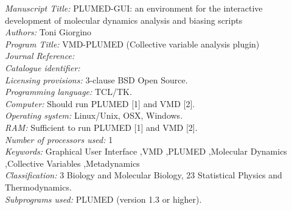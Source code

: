 \documentclass[preprint,12pt]{elsarticle}
\newcounter{bla}
\newcommand{\mytitle}{PLUMED-GUI: an environment for the interactive development 
  of molecular dynamics analysis and biasing scripts}
\newcommand{\mykeywords}{Graphical User Interface \sep VMD \sep PLUMED \sep Molecular Dynamics \sep Collective Variables \sep Metadynamics}
\begin{document}
\begin{small}
\noindent
{\em Manuscript Title:}                                       
 \mytitle \\
{\em Authors:}                                                
 Toni Giorgino \\
{\em Program Title:}                                          
 VMD-PLUMED (Collective variable analysis plugin) \\
{\em Journal Reference:}                                      \\
{\em Catalogue identifier:}                                   \\
{\em Licensing provisions:}                                   
 3-clause BSD Open Source. \\
{\em Programming language:}                                   
 TCL/TK. \\
{\em Computer:}                                               
 Should run  PLUMED [1] and VMD [2]. \\
{\em Operating system:}                                       
 Linux/Unix, OSX, Windows. \\
{\em RAM:}                                               
 Sufficient to run PLUMED [1] and VMD [2]. \\
{\em Number of processors used:}                              
 1 \\
{\em Keywords:} \mykeywords \\
{\em Classification:}                                         
  3 Biology and Molecular Biology, 23 Statistical Physics and Thermodynamics. \\
{\em Subprograms used:}                                       
  PLUMED (version 1.3 or higher). \\

\end{small}
\end{document}
